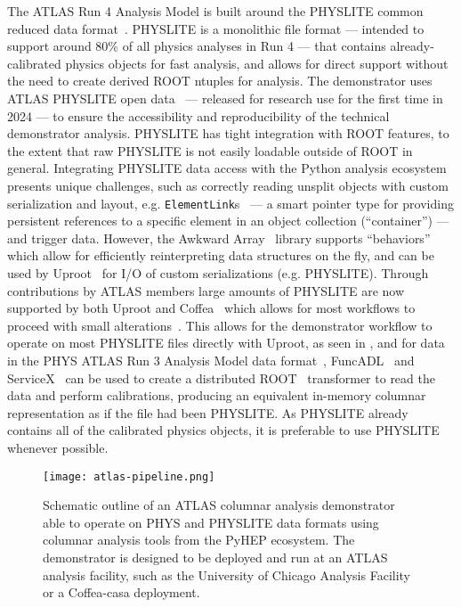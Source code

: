 The ATLAS Run 4 Analysis Model is built around the PHYSLITE common reduced data format~\cite{Schaarschmidt:2024vzr,SOFT-2022-02}.
PHYSLITE is a monolithic file format --- intended to support around 80\% of all physics analyses in Run 4 --- that contains already-calibrated physics objects for fast analysis, and allows for direct support without the need to create derived ROOT ntuples for analysis.
The demonstrator uses ATLAS PHYSLITE open data~\cite{ATL-OREACH-PROC-2024-005} --- released for research use for the first time in 2024 --- to ensure the accessibility and reproducibility of the technical demonstrator analysis.
PHYSLITE has tight integration with ROOT features, to the extent that raw PHYSLITE is not easily loadable outside of ROOT in general.
Integrating PHYSLITE data access with the Python analysis ecosystem presents unique challenges, such as correctly reading unsplit objects with custom serialization and layout, e.g. \texttt{ElementLink}s~\cite{Hartmann:2021qzp} --- a smart pointer type for providing persistent references to a specific element in an object collection (``container'') --- and trigger data.
However, the Awkward Array~\cite{Awkward_Array_2018} library supports ``behaviors'' which allow for efficiently reinterpreting data structures on the fly, and can be used by Uproot~\cite{Uproot_2017} for I/O of custom serializations (e.g. PHYSLITE).
Through contributions by ATLAS members large amounts of PHYSLITE are now supported by both Uproot and Coffea~\cite{Coffea_2023,CMS:2020kpn} which allows for most workflows to proceed with small alterations~\cite{US_ATLAS_IRISHEP_trainging:2024}.
This allows for the demonstrator workflow to operate on most PHYSLITE files directly with Uproot, as seen in , and for data in the PHYS ATLAS Run 3 Analysis Model data format~\cite{SOFT-2022-02}, FuncADL~\cite{funcadl_2024,Proffitt:2021wfh} and ServiceX~\cite{serviceX_2024,serviceX_client_2024,Galewsky:2020xig} can be used to create a distributed ROOT~\cite{Brun:1997pa} transformer to read the data and perform calibrations, producing an equivalent in-memory columnar representation as if the file had been PHYSLITE.
As PHYSLITE already contains all of the calibrated physics objects, it is preferable to use PHYSLITE whenever possible.

\begin{figure}
    \centering
    \texttt{[image: atlas-pipeline.png]}
    \caption{Schematic outline of an ATLAS columnar analysis demonstrator able to operate on PHYS and PHYSLITE data formats using columnar analysis tools from the PyHEP ecosystem.
    The demonstrator is designed to be deployed and run at an ATLAS analysis facility, such as the University of Chicago Analysis Facility or a Coffea-casa deployment.}
    \label{fig:atlas-pipeline}
\end{figure}
